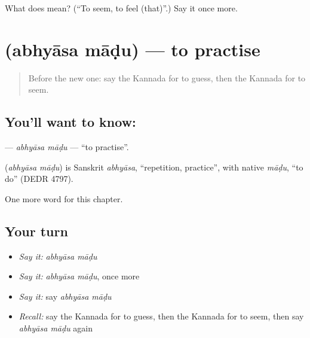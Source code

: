 \begin{tcolorbox}[breakable,colback=teal!4,colframe=teal!35!black,title={Before you move on}]
What does  mean? (\textquotedblleft{}To seem, to feel (that)\textquotedblright{}.) Say it once more.
\end{tcolorbox}
\section[\texorpdfstring{\kn{ಅಭ್ಯಾಸ} \kn{ಮಾಡು} (abhyāsa māḍu)}{ಅಭ್ಯಾಸ ಮಾಡು (abhyāsa māḍu)}]{  (abhyāsa māḍu) — to practise}

\label{lesson:KA-C277-abhyasa-madu}



\begin{quote}
Before the new one: say the Kannada for to guess, then the Kannada for to seem.
\end{quote}

\subsection*{You'll want to know:  }
\textbf{ } — \emph{abhyāsa māḍu} — \textquotedblleft{}to practise\textquotedblright{}.

\begin{cousinweb}
\textbf{ } (\emph{abhyāsa māḍu}) is Sanskrit \emph{abhyāsa}, \textquotedblleft{}repetition, practice\textquotedblright{}, with native \emph{māḍu}, \textquotedblleft{}to do\textquotedblright{} (DEDR 4797).
\end{cousinweb}

\begin{grammarlens}[title={What you've built}]
One more word for this chapter.
\end{grammarlens}

\subsection*{Your turn}
\begin{itemize}
\raggedright
  \item \emph{Say it:} \emph{abhyāsa māḍu}
  \item \emph{Say it:} \emph{abhyāsa māḍu}, once more
  \item \emph{Say it:} say \emph{abhyāsa māḍu}
  \item \emph{Recall:} say the Kannada for to guess, then the Kannada for to seem, then say \emph{abhyāsa māḍu} again
\end{itemize}

